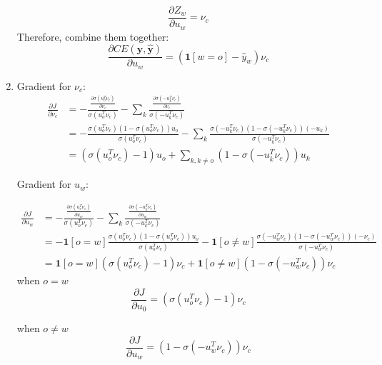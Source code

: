 \documentclass[10pt]{article}
\begin{document}
\begin{enumerate}[label=(\alph*)]
\begin{equation*}
	\frac{\partial Z_w}{\partial u_w} = \nu_c
\end{equation*}
Therefore, combine them together:
\begin{equation*}
	\frac{\partial CE(\mathbf{y}, \mathbf{\hat{y}})}{\partial u_w} = (\mathbf{1}[w=o] - \hat{y}_w)\nu_c
\end{equation*}

\item
Gradient for $\nu_c$:
\begin{equation*}
\begin{aligned}
	\frac{\partial J}{\partial \nu_c} & = -\frac{\frac{\partial \sigma(u_o^T\nu_c)}{\partial \nu_c}}{\sigma(u_o^T\nu_c)} - \sum_k \frac{\frac{\partial \sigma(-u_k^T\nu_c)}{\partial \nu_c}}{\sigma(-u_k^T\nu_c)}\\
	& = -\frac{\sigma(u_o^T\nu_c)(1-\sigma(u_o^T\nu_c))u_o}{\sigma(u_o^T\nu_c)} - \sum_k \frac{\sigma(-u_k^T\nu_c)(1-\sigma(-u_k^T\nu_c))(-u_k)}{\sigma(-u_k^T\nu_c)}\\
	& = (\sigma(u_o^T\nu_c)-1)u_o + \sum_{k, k\neq o}(1-\sigma(-u_k^T\nu_c))u_k
\end{aligned}
\end{equation*}

Gradient for $u_w$:

\begin{equation*}
\begin{aligned}
	\frac{\partial J}{\partial u_w} & = -\frac{\frac{\partial \sigma(u_o^T\nu_c)}{\partial u_w}}{\sigma(u_o^T\nu_c)} - \sum_k \frac{\frac{\partial \sigma(-u_k^T\nu_c)}{\partial u_w}}{\sigma(-u_k^T\nu_c)}\\
	& = -\mathbf{1}[o=w]\frac{\sigma(u_o^T\nu_c)(1-\sigma(u_o^T\nu_c))u_o}{\sigma(u_o^T\nu_c)} - \mathbf{1}[o\neq w]\frac{\sigma(-u_w^T\nu_c)(1-\sigma(-u_w^T\nu_c))(-\nu_c)}{\sigma(-u_w^T\nu_c)}\\
	& = \mathbf{1}[o=w](\sigma(u_o^T\nu_c)-1)\nu_c + \mathbf{1}[o\neq w](1-\sigma(-u_w^T\nu_c))\nu_c
\end{aligned}
\end{equation*}
when $o=w$
\begin{equation}
\frac{\partial J}{\partial u_0} = (\sigma(u_o^T\nu_c)-1)\nu_c
\end{equation}

when $o\neq w$
\begin{equation}
\frac{\partial J}{\partial u_w} = (1-\sigma(-u_w^T\nu_c))\nu_c
\end{equation}


\end{enumerate}
\end{document}
